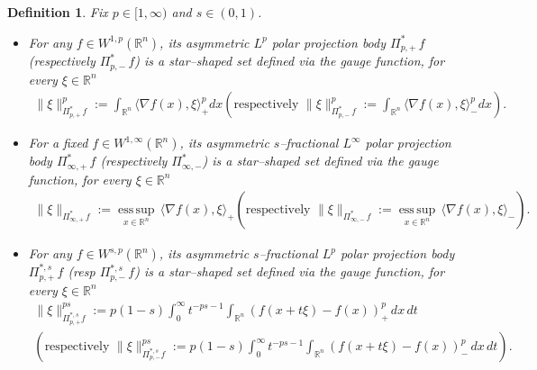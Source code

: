 \documentclass[11pt, reqno]{article}
\newtheorem{definition}[theorem]{Definition}
\theoremstyle{definition}
\numberwithin{equation}{section}
\newcommand{\R}{\mathbb{R}}
\newcommand{\esssup}{\operatorname*{ess\,sup}}
\begin{document}
\begin{definition}Fix  $p \in [1, \infty)$ and $s \in (0, 1)$.
    \begin{itemize}
    		\item[$\bullet$] For any $f \in W^{1, p} (\R^n)$, its asymmetric $L^p$ polar projection body $\Pi^{\ast}_{p, +} \, f$ (respectively  $\Pi^{\ast}_{p, -} \, f$) is a star--shaped set defined via the gauge function, for every $\xi \in \R^n$
		\begin{align*}
		\| \xi \|_{\Pi^*_{p, +} \, f}^p := \int_{\R^n} \langle \nabla f(x), \xi \rangle_+^p dx
			\left( \text{respectively } 
            \| \xi \|_{\Pi^*_{p, -} \, f}^p := \int_{\R^n} \langle \nabla f(x), \xi \rangle_-^p dx 
            \right).
	\end{align*}
	
		\item[$\bullet$] 
        For a fixed $f \in W^{1, \infty}(\R^n)$, its asymmetric $s$--fractional $L^\infty$ polar projection body $\Pi^{\ast}_{\infty, +} \, f$ (respectively $\Pi^{\ast}_{\infty, -}$) is a star--shaped set defined via the gauge function, for every $\xi \in \R^n$
        \begin{align*}
            \| \xi \|_{\Pi^{\ast}_{\infty, +} \, f} 
            := \esssup_{x \in \R^n} 
            \, \langle \nabla f(x), \xi \rangle_+  \left( \text{respectively } 
            \| \xi \|_{\Pi^{\ast}_{\infty, -} \, f} 
            := \esssup_{x \in \R^n} 
            \, \langle \nabla f(x), \xi \rangle_- \right).
        \end{align*}
    		
             
		\item[$\bullet$] For any $f \in W^{s, p}(\R^n)$, its asymmetric $s$--fractional $L^p$ polar projection body $\Pi^{\ast, s}_{p, +} \, f$ (resp $\Pi^{\ast, s}_{p, -} \, f$) is a star--shaped set defined via the gauge function, for every $\xi \in \R^n$
		\begin{align*}
		\| \xi \|^{ps}_{\Pi^{\ast, s}_{p, +} f} := p(1 - s)\int_0^\infty t^{-ps - 1} \int_{\R^n} (f(x + t\xi) - f(x))_+^p \, dx \, dt 
		\\
		\left( \text{respectively } 
            \| \xi \|^{ps}_{\Pi^{\ast, s}_{p, -} f} := p(1 - s)\int_0^\infty t^{-ps - 1} \int_{\R^n} (f(x + t\xi) - f(x))_-^p \, dx \, dt             
         \right).
		\end{align*}
	

\end{itemize}
\end{definition}
\end{document}
